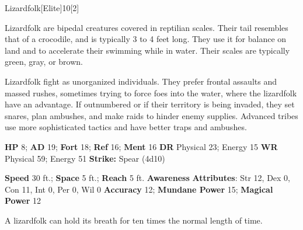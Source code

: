   \begin{monsection}{Lizardfolk}[Elite]{10}[2]
    \vspace{-1em}\vspace{-1em}
    \vspace{0em}

    
    Lizardfolk are bipedal creatures covered in reptilian scales.
    Their tail resembles that of a crocodile, and is typically 3 to 4 feet long.
    They use it for balance on land and to accelerate their swimming while in water.
    Their scales are typically green, gray, or brown.

    Lizardfolk fight as unorganized individuals.
    They prefer frontal assaults and massed rushes, sometimes trying to force foes into the water, where the lizardfolk have an advantage.
    If outnumbered or if their territory is being invaded, they set snares, plan ambushes, and make raids to hinder enemy supplies.
    Advanced tribes use more sophisticated tactics and have better traps and ambushes.
  

    \begin{spellcontent}
      \begin{spelltargetinginfo}
        \pari \textbf{HP} 8;
          \textbf{AD} 19;
          \textbf{Fort} 18;
          \textbf{Ref} 16;
          \textbf{Ment} 16
        \pari \textbf{DR} Physical 23; Energy 15
        \pari \textbf{WR} Physical 59; Energy 51
        \pari \textbf{Strike:}
            Spear  (4d10)
      \end{spelltargetinginfo}
    \end{spellcontent}
    \begin{monsterfooter}
      \pari \textbf{Speed} 30 ft.;
        \textbf{Space} 5 ft.;
        \textbf{Reach} 5 ft.
      \pari \textbf{Awareness} 
      \pari \textbf{Attributes}:
        Str 12, Dex 0,
        Con 11, Int 0,
        Per 0, Wil 0
      \pari \textbf{Accuracy} 12;
        \textbf{Mundane Power} 15;
      \textbf{Magical Power} 12
    \end{monsterfooter}
  \end{monsection}
   A lizardfolk can hold its breath for ten times the normal length of time.
  
